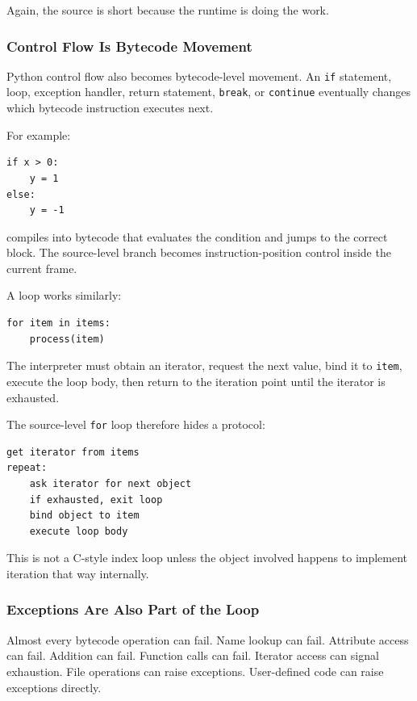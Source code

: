 Again, the source is short because the runtime is doing the work.

\subsubsection{Control Flow Is Bytecode Movement}

Python control flow also becomes bytecode-level movement. An \texttt{if} statement, loop, exception handler, return statement, \texttt{break}, or \texttt{continue} eventually changes which bytecode instruction executes next.

For example:

\begin{verbatim}
if x > 0:
    y = 1
else:
    y = -1
\end{verbatim}

compiles into bytecode that evaluates the condition and jumps to the correct block. The source-level branch becomes instruction-position control inside the current frame.

A loop works similarly:

\begin{verbatim}
for item in items:
    process(item)
\end{verbatim}

The interpreter must obtain an iterator, request the next value, bind it to \texttt{item}, execute the loop body, then return to the iteration point until the iterator is exhausted.

The source-level \texttt{for} loop therefore hides a protocol:

\begin{verbatim}
get iterator from items
repeat:
    ask iterator for next object
    if exhausted, exit loop
    bind object to item
    execute loop body
\end{verbatim}

This is not a C-style index loop unless the object involved happens to implement iteration that way internally.

\subsubsection{Exceptions Are Also Part of the Loop}

Almost every bytecode operation can fail. Name lookup can fail. Attribute access can fail. Addition can fail. Function calls can fail. Iterator access can signal exhaustion. File operations can raise exceptions. User-defined code can raise exceptions directly.

